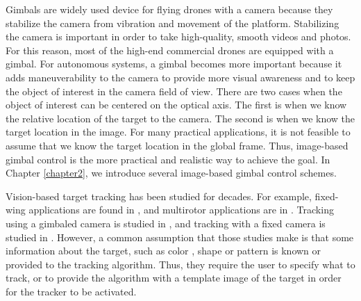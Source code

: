 Gimbals are widely used device for flying drones with a camera because they stabilize the camera from vibration and movement of the platform. Stabilizing the camera is important in order to take high-quality, smooth videos and photos. For this reason, most of the high-end commercial drones are equipped with a gimbal. For autonomous systems, a gimbal becomes more important because it adds maneuverability to the camera to provide more visual awareness and to keep the object of interest in the camera field of view. There are two cases when the object of interest can be centered on the optical axis. The first is when we know the relative location of the target to the camera. The second is when we know the target location in the image. For many practical applications, it is not feasible to assume that we know the target location in the global frame. Thus, image-based gimbal control is the more practical and realistic way to achieve the goal. In Chapter \ref{chapter2}, we introduce several image-based gimbal control schemes.

Vision-based target tracking has been studied for decades. For example, fixed-wing applications are found in \cite{Saunders2011, Rysdyk2006, Dobrokhodov2006, Qadir2011, Theodorakopoulos2008}, and multirotor applications are in \cite{Pestana2013, Thomas2017, Teuliere2011, Kim2013}. Tracking using a gimbaled camera is studied in \cite{Rysdyk2006, Dobrokhodov2006, Hurak2012}, and tracking with a fixed camera is studied in \cite{Saunders2011, Theodorakopoulos2008, Pestana2013, Thomas2017, Teuliere2011, Kim2013}. However, a common assumption that those studies make is that some information about the target, such as color \cite{Teuliere2011, Kim2013}, shape \cite{Thomas2017} or pattern \cite{Lee2012} is known or provided to the tracking algorithm. Thus, they require the user to specify what to track, or to provide the algorithm with a template image of the target in order for the tracker to be activated. 


